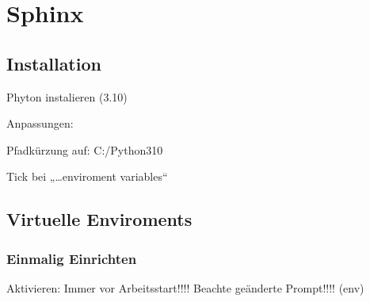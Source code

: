 \documentclass[letterpaper,10pt,ngerman]{sphinxmanual}
\begin{document}
\sphinxstepscope


\section{Sphinx}
\label{\detokenize{software/sphinx:sphinx}}\label{\detokenize{software/sphinx::doc}}

\subsection{Installation}
\label{\detokenize{software/sphinx:installation}}
\begin{DUlineblock}{0em}
\item[] \sphinxhyphen{} Phyton instalieren (3.10)
\item[]
\begin{DUlineblock}{\DUlineblockindent}
\item[] 
\end{DUlineblock}
\item[] \sphinxhyphen{} Anpassungen:
\item[]
\begin{DUlineblock}{\DUlineblockindent}
\item[] \sphinxhyphen{} Pfadkürzung auf: C:/Python310
\item[] \sphinxhyphen{} Tick bei „…enviroment variables“
\end{DUlineblock}
\end{DUlineblock}


\subsection{Virtuelle Enviroments}
\label{\detokenize{software/sphinx:virtuelle-enviroments}}

\subsubsection{Einmalig Einrichten}
\label{\detokenize{software/sphinx:einmalig-einrichten}}
\begin{sphinxVerbatim}[commandchars=\\\{\}]
 \PYGZbs{}\PYGZbs{}\PYGZbs{}
   
\end{sphinxVerbatim}

\sphinxAtStartPar
Aktivieren: Immer vor Arbeitsstart!!!!
Beachte geänderte Prompt!!!! (env)
\end{document}
